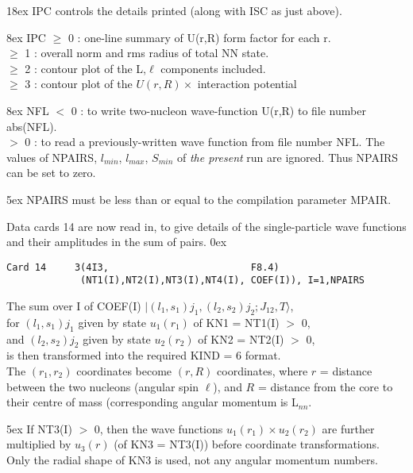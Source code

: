 \documentclass[11pt]{article}
\begin{document}
\hangindent 18ex
IPC controls the details printed (along with ISC as just above).

\hangindent 8ex  IPC
      $\geq$ 0 : one-line summary of U(r,R) form factor for each r.
\\  $\geq$ 1 : overall norm and rms radius of total NN state.
\\  $\geq$ 2 : contour plot of the L,$\ell$ components included.
\\  $\geq$ 3 : contour plot of the $U(r,R) \times$ interaction potential



\hangindent 8ex  NFL
      $<$ 0    : to write two-nucleon wave-function U(r,R) to file
number abs(NFL).
\\  $>$ 0 : to read a previously-written wave function from file number
NFL.  The values of NPAIRS, $l_{min}$, $l_{max}$, $S_{min}$ of
{\em the present}
run are ignored.  Thus NPAIRS can be set to zero.



\hangindent 5ex
NPAIRS must be less than or equal to the compilation parameter MPAIR.

\bigskip
Data cards 14 are now read in, to give details of the single-particle
wave functions and their amplitudes in the sum of pairs.
%
\hangindent 0ex
\begin{verbatim}
Card 14     3(4I3,                         F8.4)
             (NT1(I),NT2(I),NT3(I),NT4(I), COEF(I)), I=1,NPAIRS
\end{verbatim}
The sum over I of  COEF(I) $| (l_1,s_1)j_1, (l_2,s_2)j_2 ; J_{12},T \rangle$,
\\
   for  $(l_1,s_1)j_1$  given by state $u_1(r_1)$ of KN1 = NT1(I) $>$ 0,
\\
   and  $(l_2,s_2)j_2$  given by state $u_2(r_2)$ of KN2 = NT2(I) $>$ 0,
\\
is then transformed into the required KIND = 6 format.\\
The $(r_1,r_2)$ coordinates become $(r,R)$ coordinates,
where
$r$ = distance between the two nucleons (angular spin $\ell$), and
$R$ = distance from the core to their centre of mass
     (corresponding angular momentum is L$_{nn}$.

\hangindent 5ex
If NT3(I) $>$ 0, then the wave functions $u_1(r_1)\times u_2(r_2)$ are further
multiplied by $u_3(r)$ (of KN3 = NT3(I)) before coordinate transformations.
Only the radial shape of KN3 is used, not any angular momentum numbers.
\bigskip
\end{document}
